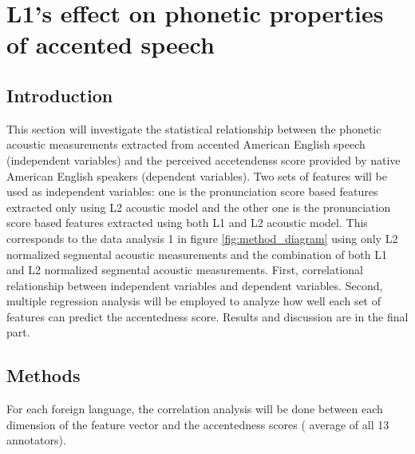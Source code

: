 \chapter{L1's effect on phonetic properties of accented speech}
\label{l1_seg}

\section{Introduction}

This section will investigate the statistical relationship between the phonetic acoustic measurements extracted from accented American English speech (independent variables) and the perceived accetendenss score provided by native American English speakers (dependent variables). Two sets of features will be used as independent variables: one is the pronunciation score based features extracted only using L2 acoustic model and the other one is the pronunciation score based features extracted using both L1 and L2 acoustic model. This corresponds to the data analysis 1 in figure \ref{fig:method_diagram} using only L2 normalized segmental acoustic measurements and the combination of  both L1 and L2 normalized segmental acoustic measurements. First, correlational relationship between independent variables and dependent variables. Second, multiple regression analysis will be employed to analyze how well each set of features can predict the accentedness score. Results and discussion are in the final part.

\section{Methods}


For each foreign language, the correlation analysis will be done between each dimension of the feature vector and the accentedness scores ( average of all 13 annotators). 